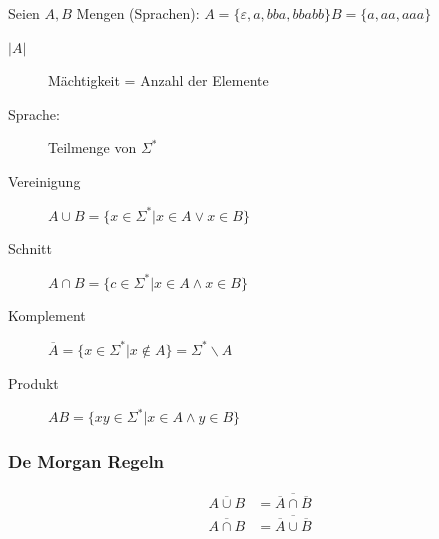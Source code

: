 \documentclass{scrartcl}
\begin{document}
Seien $A,B$ Mengen (Sprachen): {\tiny $A=\{\varepsilon, a, bba, bbabb\} B=\{a,aa,aaa\}$}
\begin{description}
    \item[$|A|$] Mächtigkeit = Anzahl der Elemente
    \item[Sprache:] Teilmenge von $\Sigma^*$
    \item[Vereinigung] $A\cup B=\{x\in\Sigma^* | x\in A \vee x\in B\}$
    \item[Schnitt] $A\cap B=\{c\in\Sigma^* | x\in A \wedge x\in B\}$
    \item[Komplement] $\overline{A}=\{x\in\Sigma^* | x \not\in A\} = \Sigma^*\backslash A$
    \item[Produkt] $AB=\{xy\in\Sigma^* | x\in A \wedge y\in B\}$
\end{description}

\subsubsection*{De Morgan Regeln}
\begin{align*}
\overline{A \cup B} &= \overline{\overline{A}\cap \overline{B}} \\
\overline{A\cap B} &= \overline{\overline{A} \cup \overline{B}}
\end{align*}
\end{document}
